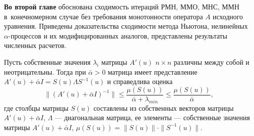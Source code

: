 \documentclass[%
autoref,     %
href,        %
facsimile,   %
colorlinks,  %
]{disser}
\begin{document}

\textbf{Во второй главе} обоснована сходимость итераций РМН, ММО, МНС, ММН в~конечномерном случае без требования монотонности оператора $A$ исходного уравнения. Приведены доказательства сходимости метода Ньютона, нелинейных $\alpha$-процессов и их модифицированных аналогов, представлены результаты численных расчетов.

Пусть собственные значения $\lambda _i$ матрицы $A'(u)$ $n\times n$ различны между собой и неотрицательны. Тогда при $\bar\alpha>0$ матрица имеет представление $A'(u)+\bar\alpha I =S(u)\Lambda S^{-1}(u)$ и справедлива оценка
\begin{equation}\label{est4.1}
\|(A'(u)+\bar\alpha I)^{-1}\|\leqslant \frac{\mu (S(u))}{\bar\alpha+\lambda_{min}} \leqslant \frac{\mu(S(u))}{\bar\alpha},
\end{equation}
где столбцы матрицы $S(u)$ составлены из собственных векторов матрицы $A'(u)+\bar\alpha I$, $\Lambda$ --- диагональная матрица, ее элементы --- собственные значения матрицы $A'(u)+\bar\alpha I$, $\mu(S(u))=\|S(u)\|\cdot\|S^{-1}(u)\|$.
\end{document}
